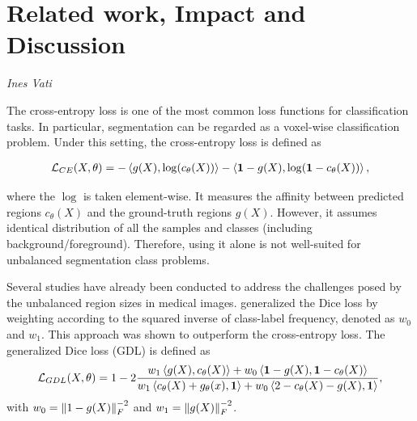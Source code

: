 \documentclass[onecolumn]{article}
\begin{document}



\section{Related work, Impact and Discussion} \textit{Ines Vati}

The cross-entropy loss is one of the most common loss functions for classification tasks. In particular, segmentation can be regarded as a voxel-wise classification problem. Under this setting, the cross-entropy loss is defined as

\begin{equation}\label{eq:CE}
\begin{split}
    \mathcal{L}_{CE}(X, \theta) = -\left \langle g(X), \log(c_\theta(X)) \right \rangle -  \left \langle \mathbf{1}-g(X), \log(\mathbf{1}-c_\theta(X)) \right \rangle,
\end{split}
\end{equation}

where the $\log$ is taken element-wise. It measures the affinity between predicted regions $c_\theta(X)$ and the ground-truth regions $g(X)$. However, it assumes identical distribution of all the samples and classes (including background/foreground). Therefore, using it alone is not well-suited for unbalanced segmentation class problems.

Several studies have already been conducted to address the challenges posed by the unbalanced region sizes in medical images. \cite{sudre_generalised_2017} generalized the Dice loss by weighting according to the squared inverse of class-label frequency, denoted as $w_0$ and $w_1$.
This approach was shown to outperform the cross-entropy loss. The generalized Dice loss (GDL) is defined as 
 \begin{equation}\label{eq:GDL}
        \mathcal{L}_{GDL}(X, \theta) = 1-2 \frac{w_1\left \langle g(X), c_\theta(X) \right \rangle+w_0\left \langle \mathbf{1}-g(X), \mathbf{1}-c_\theta(X) \right \rangle}{w_1\left \langle c_\theta(X)+g_\theta(x), \mathbf{1} \right \rangle+w_0\left \langle 2-c_\theta(X)-g(X), \mathbf{1} \right \rangle},
    \end{equation}
with $w_0=\left \lVert 1-g(X) \right \rVert_F^{-2}$ and $w_1 =\left \lVert g(X) \right \rVert_F^{-2}$.
\end{document}
